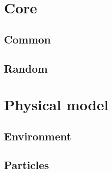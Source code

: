 \documentclass[a4paper, 12pt]{article}
\def\buildMode{buildmissing}
\begin{document}
    \newpage
    \tableofcontents
    \clearpage

    \section{Core}

        \subsection{Common}
        \begin{figure}[htb]
            \centering
            
            \caption{}
        \end{figure}

        \subsection{Random}
        \begin{figure}[htb]
            \centering
            
            \caption{}
        \end{figure}
        \clearpage

    \section{Physical model}

        \subsection{Environment}

        \begin{figure}[htb]
            \centering
            
            \caption{}
        \end{figure}
        \clearpage

        \subsection{Particles}

        \begin{figure}[htb]
            \centering
            
            \caption{}
        \end{figure}
        \clearpage
\end{document}
